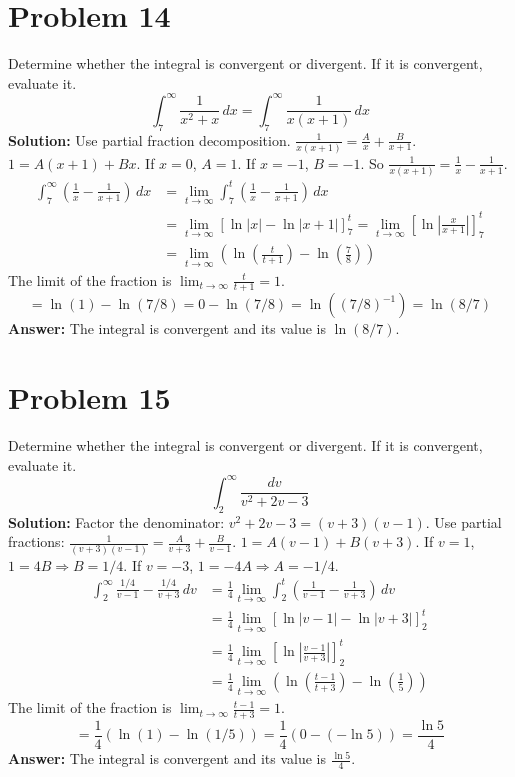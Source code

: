 \documentclass{article}
\begin{document}
\section{Problem 14}
Determine whether the integral is convergent or divergent. If it is convergent, evaluate it.
\[ \int_{7}^{\infty} \frac{1}{x^2+x} \,dx = \int_{7}^{\infty} \frac{1}{x(x+1)} \,dx \]
\textbf{Solution:}
Use partial fraction decomposition. $\frac{1}{x(x+1)} = \frac{A}{x} + \frac{B}{x+1}$.
$1 = A(x+1) + Bx$. If $x=0$, $A=1$. If $x=-1$, $B=-1$. So $\frac{1}{x(x+1)} = \frac{1}{x} - \frac{1}{x+1}$.
\begin{align*}
    \int_{7}^{\infty} \left(\frac{1}{x} - \frac{1}{x+1}\right) \,dx &= \lim_{t \to \infty} \int_{7}^{t} \left(\frac{1}{x} - \frac{1}{x+1}\right) \,dx \\
    &= \lim_{t \to \infty} [\ln|x| - \ln|x+1|]_7^t = \lim_{t \to \infty} \left[\ln\left|\frac{x}{x+1}\right|\right]_7^t \\
    &= \lim_{t \to \infty} \left(\ln\left(\frac{t}{t+1}\right) - \ln\left(\frac{7}{8}\right)\right)
\end{align*}
The limit of the fraction is $\lim_{t \to \infty} \frac{t}{t+1} = 1$.
\[ = \ln(1) - \ln(7/8) = 0 - \ln(7/8) = \ln((7/8)^{-1}) = \ln(8/7) \]
\textbf{Answer:} The integral is convergent and its value is $\ln(8/7)$.

\section{Problem 15}
Determine whether the integral is convergent or divergent. If it is convergent, evaluate it.
\[ \int_{2}^{\infty} \frac{dv}{v^2+2v-3} \]
\textbf{Solution:}
Factor the denominator: $v^2+2v-3 = (v+3)(v-1)$. Use partial fractions: $\frac{1}{(v+3)(v-1)} = \frac{A}{v+3} + \frac{B}{v-1}$.
$1 = A(v-1) + B(v+3)$. If $v=1$, $1=4B \Rightarrow B=1/4$. If $v=-3$, $1=-4A \Rightarrow A=-1/4$.
\begin{align*}
    \int_{2}^{\infty} \frac{1/4}{v-1} - \frac{1/4}{v+3} \,dv &= \frac{1}{4} \lim_{t \to \infty} \int_{2}^{t} \left(\frac{1}{v-1} - \frac{1}{v+3}\right) \,dv \\
    &= \frac{1}{4} \lim_{t \to \infty} [\ln|v-1| - \ln|v+3|]_2^t \\
    &= \frac{1}{4} \lim_{t \to \infty} \left[\ln\left|\frac{v-1}{v+3}\right|\right]_2^t \\
    &= \frac{1}{4} \lim_{t \to \infty} \left(\ln\left(\frac{t-1}{t+3}\right) - \ln\left(\frac{1}{5}\right)\right)
\end{align*}
The limit of the fraction is $\lim_{t \to \infty} \frac{t-1}{t+3} = 1$.
\[ = \frac{1}{4}(\ln(1) - \ln(1/5)) = \frac{1}{4}(0 - (-\ln 5)) = \frac{\ln 5}{4} \]
\textbf{Answer:} The integral is convergent and its value is $\frac{\ln 5}{4}$.
\end{document}
